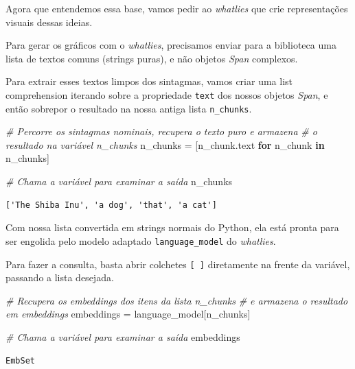 \documentclass[
  brazilian,
]{article}
\newenvironment{Shaded}{}{}
\newcommand{\CommentTok}[1]{\textcolor[rgb]{0.38,0.63,0.69}{\textit{#1}}}
\newcommand{\ControlFlowTok}[1]{\textcolor[rgb]{0.00,0.44,0.13}{\textbf{#1}}}
\newcommand{\KeywordTok}[1]{\textcolor[rgb]{0.00,0.44,0.13}{\textbf{#1}}}
\newcommand{\NormalTok}[1]{#1}
\newcommand{\OperatorTok}[1]{\textcolor[rgb]{0.40,0.40,0.40}{#1}}
\begin{document}
Agora que entendemos essa base, vamos pedir ao \emph{whatlies} que crie
representações visuais dessas ideias.

Para gerar os gráficos com o \emph{whatlies}, precisamos enviar para a
biblioteca uma lista de textos comuns (strings puras), e não objetos
\emph{Span} complexos.

Para extrair esses textos limpos dos sintagmas, vamos criar uma list
comprehension iterando sobre a propriedade \texttt{text} dos nossos
objetos \emph{Span}, e então sobrepor o resultado na nossa antiga lista
\texttt{n\_chunks}.

\begin{Shaded}
\begin{Highlighting}[]
\CommentTok{\# Percorre os sintagmas nominais, recupera o texto puro e armazena}
\CommentTok{\# o resultado na variável \textquotesingle{}n\_chunks\textquotesingle{}}
\NormalTok{n\_chunks }\OperatorTok{=}\NormalTok{ [n\_chunk.text }\ControlFlowTok{for}\NormalTok{ n\_chunk }\KeywordTok{in}\NormalTok{ n\_chunks]}

\CommentTok{\# Chama a variável para examinar a saída}
\NormalTok{n\_chunks}
\end{Highlighting}
\end{Shaded}

\begin{verbatim}
['The Shiba Inu', 'a dog', 'that', 'a cat']
\end{verbatim}

Com nossa lista convertida em strings normais do Python, ela está pronta
para ser engolida pelo modelo adaptado \texttt{language\_model} do
\emph{whatlies}.

Para fazer a consulta, basta abrir colchetes \texttt{{[}\ {]}}
diretamente na frente da variável, passando a lista desejada.

\begin{Shaded}
\begin{Highlighting}[]
\CommentTok{\# Recupera os embeddings dos itens da lista \textquotesingle{}n\_chunks\textquotesingle{}}
\CommentTok{\# e armazena o resultado em \textquotesingle{}embeddings\textquotesingle{}}
\NormalTok{embeddings }\OperatorTok{=}\NormalTok{ language\_model[n\_chunks]}

\CommentTok{\# Chama a variável para examinar a saída}
\NormalTok{embeddings}
\end{Highlighting}
\end{Shaded}

\begin{verbatim}
EmbSet
\end{verbatim}
\end{document}
